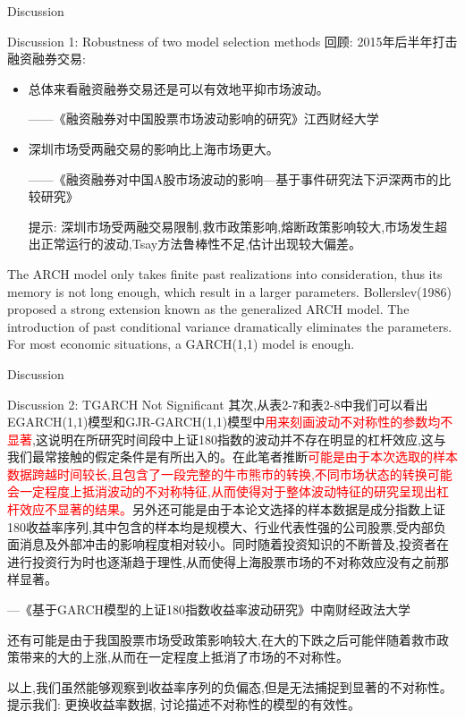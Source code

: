 \documentclass{beamer}
\begin{document}
\begin{frame}{Discussion}
  \begin{block}{Discussion 1: Robustness of two model selection methods}
    回顾: 2015年后半年打击融资融券交易:\\
    \begin{itemize}
      \item 总体来看融资融券交易还是可以有效地平抑市场波动。\\
      \begin{flushright}
        ——《融资融券对中国股票市场波动影响的研究》江西财经大学
      \end{flushright}
      \item 深圳市场受两融交易的影响比上海市场更大。\\
      \begin{flushright}
        ——《融资融券对中国A股市场波动的影响—基于事件研究法下沪深两市的比较研究》\\
      \end{flushright}
      提示: 深圳市场受两融交易限制,救市政策影响,熔断政策影响较大,市场发生超出正常运行的波动,Tsay方法鲁棒性不足,估计出现较大偏差。
    \end{itemize}
  \end{block}
		The ARCH model only takes finite past realizations into consideration, thus its memory is not long enough, which result in a larger parameters. Bollerslev(1986) proposed a strong extension known as the generalized ARCH model. The introduction of past conditional variance dramatically eliminates the parameters. For most economic situations, a GARCH(1,1) model is enough. 
\end{frame}

\begin{frame}{Discussion}
  \footnotesize
  \begin{block}{Discussion 2: TGARCH Not Significant}
    其次,从表2-7和表2-8中我们可以看出EGARCH(1,1)模型和GJR-GARCH(1,1)模型中\textcolor{red}{用来刻画波动不对称性的参数均不显著},这说明在所研究时间段中上证180指数的波动并不存在明显的杠杆效应,这与我们最常接触的假定条件是有所出入的。在此笔者推断\textcolor{red}{可能是由于本次选取的样本数据跨越时间较长,且包含了一段完整的牛市熊市的转换,不同市场状态的转换可能会一定程度上抵消波动的不对称特征,从而使得对于整体波动特征的研究呈现出杠杆效应不显著的结果。}另外还可能是由于本论文选择的样本数据是成分指数上证180收益率序列,其中包含的样本均是规模大、行业代表性强的公司股票,受内部负面消息及外部冲击的影响程度相对较小。同时随着投资知识的不断普及,投资者在进行投资行为时也逐渐趋于理性,从而使得上海股票市场的不对称效应没有之前那样显著。
    \begin{flushright}
      ---《基于GARCH模型的上证180指数收益率波动研究》中南财经政法大学 
    \end{flushright}

    还有可能是由于我国股票市场受政策影响较大,在大的下跌之后可能伴随着救市政策带来的大的上涨,从而在一定程度上抵消了市场的不对称性。\vskip 0.3cm 

    以上,我们虽然能够观察到收益率序列的负偏态,但是无法捕捉到显著的不对称性。提示我们: 更换收益率数据, 讨论描述不对称性的模型的有效性。
  \end{block}
\end{frame}
\end{document}
